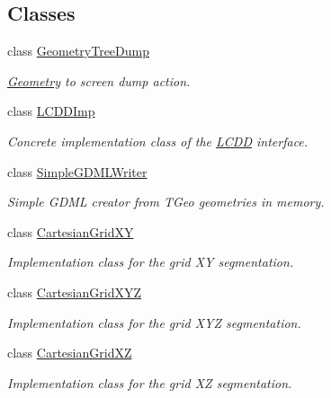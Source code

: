 \subsection*{Classes}
\begin{DoxyCompactItemize}
\item 
class \hyperlink{class_d_d4hep_1_1_geometry_1_1_geometry_tree_dump}{GeometryTreeDump}
\begin{DoxyCompactList}\small\item\em \hyperlink{namespace_d_d4hep_1_1_geometry}{Geometry} to screen dump action. \item\end{DoxyCompactList}\item 
class \hyperlink{class_d_d4hep_1_1_geometry_1_1_l_c_d_d_imp}{LCDDImp}
\begin{DoxyCompactList}\small\item\em Concrete implementation class of the \hyperlink{class_d_d4hep_1_1_geometry_1_1_l_c_d_d}{LCDD} interface. \item\end{DoxyCompactList}\item 
class \hyperlink{class_d_d4hep_1_1_geometry_1_1_simple_g_d_m_l_writer}{SimpleGDMLWriter}
\begin{DoxyCompactList}\small\item\em Simple GDML creator from TGeo geometries in memory. \item\end{DoxyCompactList}\item 
class \hyperlink{class_d_d4hep_1_1_geometry_1_1_cartesian_grid_x_y}{CartesianGridXY}
\begin{DoxyCompactList}\small\item\em Implementation class for the grid XY segmentation. \item\end{DoxyCompactList}\item 
class \hyperlink{class_d_d4hep_1_1_geometry_1_1_cartesian_grid_x_y_z}{CartesianGridXYZ}
\begin{DoxyCompactList}\small\item\em Implementation class for the grid XYZ segmentation. \item\end{DoxyCompactList}\item 
class \hyperlink{class_d_d4hep_1_1_geometry_1_1_cartesian_grid_x_z}{CartesianGridXZ}
\begin{DoxyCompactList}\small\item\em Implementation class for the grid XZ segmentation. \item\end{DoxyCompactList}\item 

\end{DoxyCompactItemize}
